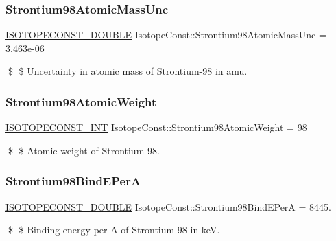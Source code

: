 \subsubsection{\texorpdfstring{Strontium98\+Atomic\+Mass\+Unc}{Strontium98AtomicMassUnc}}
{\footnotesize\ttfamily \mbox{\hyperlink{group___isotope_const-_macros_ga8f45a7272ce02c0b4c65c44636ed719a}{I\+S\+O\+T\+O\+P\+E\+C\+O\+N\+S\+T\+\_\+\+D\+O\+U\+B\+LE}} Isotope\+Const\+::\+Strontium98\+Atomic\+Mass\+Unc = 3.\+463e-\/06}

\$ \$ Uncertainty in atomic mass of Strontium-\/98 in amu. \mbox{\label{group___isotope_const-_strontium-_sr98_ga8f81ac43878ab393e9ccc4210a23e144}} 
\subsubsection{\texorpdfstring{Strontium98\+Atomic\+Weight}{Strontium98AtomicWeight}}
{\footnotesize\ttfamily \mbox{\hyperlink{group___isotope_const-_macros_ga5f18360b3e99483a35c32d789e62621c}{I\+S\+O\+T\+O\+P\+E\+C\+O\+N\+S\+T\+\_\+\+I\+NT}} Isotope\+Const\+::\+Strontium98\+Atomic\+Weight = 98}

\$ \$ Atomic weight of Strontium-\/98. \mbox{\label{group___isotope_const-_strontium-_sr98_ga670ef2e40f9b6a9b1ff66027f3bd192c}} 
\subsubsection{\texorpdfstring{Strontium98\+Bind\+E\+PerA}{Strontium98BindEPerA}}
{\footnotesize\ttfamily \mbox{\hyperlink{group___isotope_const-_macros_ga8f45a7272ce02c0b4c65c44636ed719a}{I\+S\+O\+T\+O\+P\+E\+C\+O\+N\+S\+T\+\_\+\+D\+O\+U\+B\+LE}} Isotope\+Const\+::\+Strontium98\+Bind\+E\+PerA = 8445.}

\$ \$ Binding energy per A of Strontium-\/98 in keV. \mbox{\label{group___isotope_const-_strontium-_sr98_ga243d2e6b5c1311a4426cbd59d696dc9c}} 
